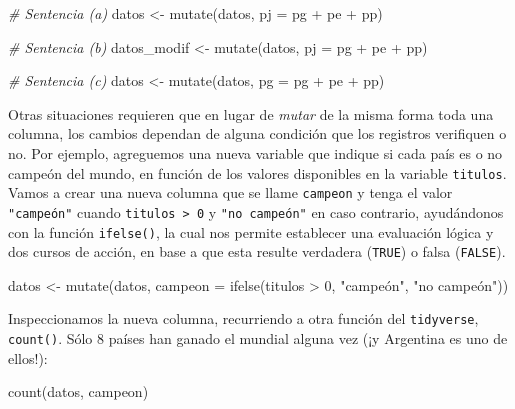 \documentclass[
]{book}
\newenvironment{Shaded}{\begin{snugshade}}{\end{snugshade}}
\newcommand{\AttributeTok}[1]{\textcolor[rgb]{0.77,0.63,0.00}{#1}}
\newcommand{\CommentTok}[1]{\textcolor[rgb]{0.56,0.35,0.01}{\textit{#1}}}
\newcommand{\DecValTok}[1]{\textcolor[rgb]{0.00,0.00,0.81}{#1}}
\newcommand{\FunctionTok}[1]{\textcolor[rgb]{0.00,0.00,0.00}{#1}}
\newcommand{\NormalTok}[1]{#1}
\newcommand{\OtherTok}[1]{\textcolor[rgb]{0.56,0.35,0.01}{#1}}
\newcommand{\SpecialCharTok}[1]{\textcolor[rgb]{0.00,0.00,0.00}{#1}}
\newcommand{\StringTok}[1]{\textcolor[rgb]{0.31,0.60,0.02}{#1}}
\begin{document}
\begin{Shaded}
\begin{Highlighting}[]
\CommentTok{\# Sentencia (a)}
\NormalTok{datos }\OtherTok{\textless{}{-}} \FunctionTok{mutate}\NormalTok{(datos, }\AttributeTok{pj =}\NormalTok{ pg }\SpecialCharTok{+}\NormalTok{ pe }\SpecialCharTok{+}\NormalTok{ pp)}

\CommentTok{\# Sentencia (b)}
\NormalTok{datos\_modif }\OtherTok{\textless{}{-}} \FunctionTok{mutate}\NormalTok{(datos, }\AttributeTok{pj =}\NormalTok{ pg }\SpecialCharTok{+}\NormalTok{ pe }\SpecialCharTok{+}\NormalTok{ pp)}

\CommentTok{\# Sentencia (c)}
\NormalTok{datos }\OtherTok{\textless{}{-}} \FunctionTok{mutate}\NormalTok{(datos, }\AttributeTok{pg =}\NormalTok{ pg }\SpecialCharTok{+}\NormalTok{ pe }\SpecialCharTok{+}\NormalTok{ pp)}
\end{Highlighting}
\end{Shaded}

Otras situaciones requieren que en lugar de \emph{mutar} de la misma forma toda una columna, los cambios dependan de alguna condición que los registros verifiquen o no. Por ejemplo, agreguemos una nueva variable que indique si cada país es o no campeón del mundo, en función de los valores disponibles en la variable \texttt{titulos}. Vamos a crear una nueva columna que se llame \texttt{campeon} y tenga el valor \texttt{"campeón"} cuando \texttt{titulos\ \textgreater{}\ 0} y \texttt{"no\ campeón"} en caso contrario, ayudándonos con la función \texttt{ifelse()}, la cual nos permite establecer una evaluación lógica y dos cursos de acción, en base a que esta resulte verdadera (\texttt{TRUE}) o falsa (\texttt{FALSE}).

\begin{Shaded}
\begin{Highlighting}[]
\NormalTok{datos }\OtherTok{\textless{}{-}} \FunctionTok{mutate}\NormalTok{(datos, }\AttributeTok{campeon =} \FunctionTok{ifelse}\NormalTok{(titulos }\SpecialCharTok{\textgreater{}} \DecValTok{0}\NormalTok{, }\StringTok{"campeón"}\NormalTok{, }\StringTok{"no campeón"}\NormalTok{))}
\end{Highlighting}
\end{Shaded}

Inspeccionamos la nueva columna, recurriendo a otra función del \texttt{tidyverse}, \texttt{count()}. Sólo 8 países han ganado el mundial alguna vez (¡y Argentina es uno de ellos!):

\begin{Shaded}
\begin{Highlighting}[]
\FunctionTok{count}\NormalTok{(datos, campeon)}
\end{Highlighting}
\end{Shaded}
\end{document}
